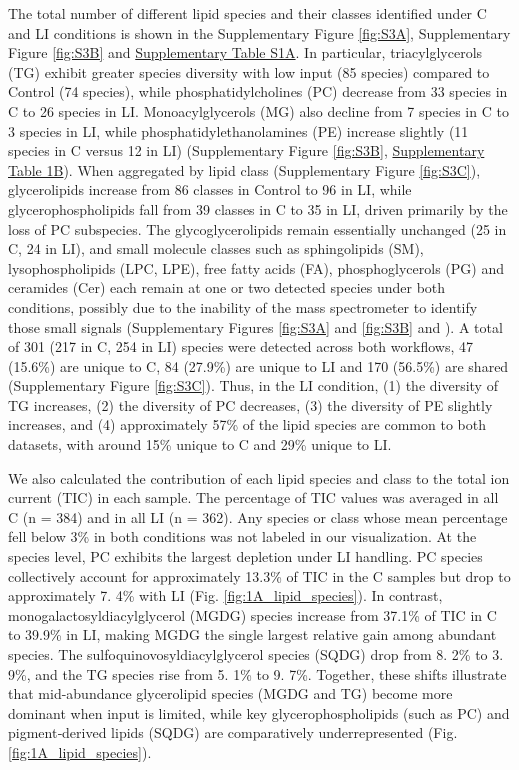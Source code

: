 \documentclass[10pt,letterpaper]{article}
\begin{document}
The total number of different lipid species and their classes identified under C and LI conditions is shown in the Supplementary Figure \ref{fig:S3A}, Supplementary Figure \ref{fig:S3B} and  \href{https://docs.google.com/spreadsheets/d/1SB90-QLYheKEzmHCUIh1UfgkrtbL064s8Oo5BfwFaV0/edit?gid=1876149577#gid=1876149577}{Supplementary Table S1A}. In particular, triacylglycerols (TG) exhibit greater species diversity with low input (85 species) compared to Control (74 species), while phosphatidylcholines (PC) decrease from 33 species in C to 26 species in LI. Monoacylglycerols (MG) also decline from 7 species in C to 3 species in LI, while phosphatidylethanolamines (PE) increase slightly (11 species in C versus 12 in LI) (Supplementary Figure \ref{fig:S3B}, \href{https://docs.google.com/spreadsheets/d/1SB90-QLYheKEzmHCUIh1UfgkrtbL064s8Oo5BfwFaV0/edit?gid=1876149577#gid=1876149577}{Supplementary Table 1B}). When aggregated by lipid class (Supplementary Figure \ref{fig:S3C}), glycerolipids increase from 86 classes in Control to 96 in LI, while glycerophospholipids fall from 39 classes in C to 35 in LI, driven primarily by the loss of PC subspecies. The glycoglycerolipids remain essentially unchanged (25 in C, 24 in LI), and small molecule classes such as sphingolipids (SM), lysophospholipids (LPC, LPE), free fatty acids (FA), phosphoglycerols (PG) and ceramides (Cer) each remain at one or two detected species under both conditions, possibly due to the inability of the mass spectrometer to identify those small signals (Supplementary Figures \ref{fig:S3A} and \ref{fig:S3B} and ). A total of 301 (217 in C, 254 in LI) species were detected across both workflows, 47 (15.6\%) are unique to C, 84 (27.9\%) are unique to LI and 170 (56.5\%) are shared (Supplementary Figure \ref{fig:S3C}). Thus, in the LI condition, (1) the diversity of TG increases, (2) the diversity of PC decreases, (3) the diversity of PE slightly increases, and (4) approximately 57\% of the lipid species are common to both datasets, with around 15\% unique to C and 29\% unique to LI.

We also calculated the contribution of each lipid species and class to the total ion current (TIC) in each sample. The percentage of TIC values was averaged in all C (n = 384) and in all LI (n = 362). Any species or class whose mean percentage fell below 3\% in both conditions was not labeled in our visualization. At the species level, PC exhibits the largest depletion under LI handling. PC species collectively account for approximately 13.3\% of TIC in the C samples but drop to approximately 7. 4\% with LI (Fig. \ref{fig:1A_lipid_species}). In contrast, monogalactosyldiacylglycerol (MGDG) species increase from 37.1\% of TIC in C to 39.9\% in LI, making MGDG the single largest relative gain among abundant species. The sulfoquinovosyldiacylglycerol species (SQDG) drop from 8. 2\% to 3. 9\%, and the TG species rise from 5. 1\% to 9. 7\%. Together, these shifts illustrate that mid-abundance glycerolipid species (MGDG and TG) become more dominant when input is limited, while key glycerophospholipids (such as PC) and pigment‐derived lipids (SQDG) are comparatively underrepresented (Fig. \ref{fig:1A_lipid_species}).
\end{document}
